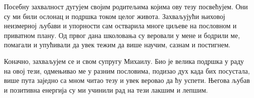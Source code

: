 \documentclass[a4paper,12pt,oneside]{memoir}
\begin{document}
Посебну захвалност дугујем својим родитељима којима ову тезу
посвећујем. Они су ми били ослонац и подршка током целог
живота. Захваљујући њиховој неизмерној љубави и упорности сам
остварила многе циљеве на пословном и приватном плану. Од првог дана
школовања су веровали у мене и бодрили ме, помагали и упућивали да
увек тежим да више научим, сазнам и постигнем.

Коначно, захваљујем се и свом супругу Михаилу. Био је велика подршка у
раду на овој тези, одмењивао ме у разним пословима, подизао дух када
бих посустала, више пута заједно са мном читао тезу и увек веровао да
ћу успети. Његова љубав и позитивна енергија су ми учинили рад на тези
лакшим и лепшим.
\newpage


\apstrakt
\apstrakten
\tableofcontents*

\mainmatter

%
%










\literatura

\backmatter
\end{document}

